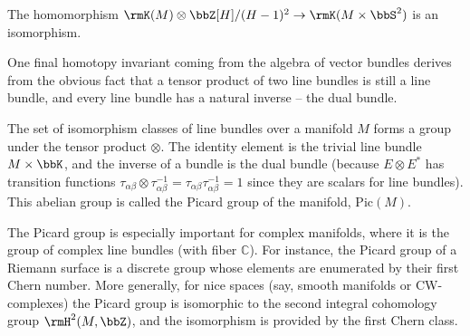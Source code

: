 \begin{thm}
    The homomorphism $\rmK(M)\otimes \bbZ[H]\slash(H-1)^2\to \rmK(M\times\bbS^2)$ is an isomorphism.
\end{thm}


One final homotopy invariant coming from the algebra of vector bundles derives from the obvious fact that a tensor product of two line bundles is still a line bundle, and every line bundle has a natural inverse -- the dual bundle.

\begin{defn}
    The set of isomorphism classes of line bundles over a manifold $M$ forms a group under the tensor product $\otimes$. The identity element is the trivial line bundle $M\times\bbK $, and the inverse of a bundle is the dual bundle (because $E\otimes E^\ast$ has transition functions $\tau_{\alpha\beta}\otimes \tau_{\alpha\beta}^{-1}=\tau_{\alpha\beta} \tau_{\alpha\beta}^{-1}=1$ since they are scalars for line bundles).
    This abelian group is called the Picard group of the manifold, $\mathrm{Pic}(M)$.
\end{defn}
\begin{rem}
    The Picard group is especially important for complex manifolds, where it is the group of complex line bundles (with fiber $\mathbb{C}$). For instance, the Picard group of a Riemann surface is a discrete group whose elements are enumerated by their first Chern number. More generally, for nice spaces (say, smooth manifolds or CW-complexes) the Picard group is isomorphic to the second integral cohomology group $\rmH^2(M,\bbZ)$, and the isomorphism is provided by the first Chern class.
\end{rem}






